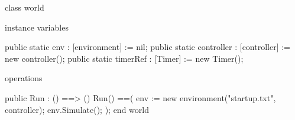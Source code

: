 \documentclass[a4paper]{article}
\begin{document}
\title{}
\author{}
\begin{vdm_al}
class world
  
instance variables  
  

public static  env : [environment] := nil;
public static  controller : [controller] :=  new controller();
public static  timerRef : [Timer] := new Timer();    

  
   
operations

public 
  Run : () ==> ()
  Run() ==(
    env := new environment("startup.txt", controller);
    env.Simulate();
    );
end world
\end{vdm_al}
\end{document}
